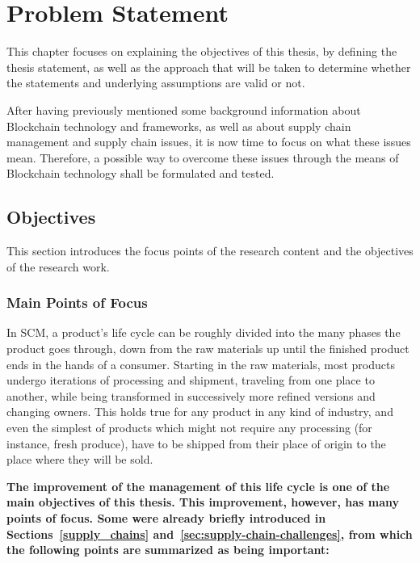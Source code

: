 \chapter{Problem Statement}
\label{chap:supply-chain-problems}
\minitoc \mtcskip \noindent 

This chapter focuses on explaining the objectives of this thesis, by defining the thesis statement, as well as the approach that will be taken to determine whether the statements and underlying assumptions are valid or not.

After having previously mentioned some background information about Blockchain technology and frameworks, as well as about supply chain management and supply chain issues, it is now time to focus on what these issues mean. Therefore, a possible way to overcome these issues through the means of Blockchain technology shall be formulated and tested.

\section{Objectives}

This section introduces the focus points of the research content and the objectives of the research work.

\subsection{Main Points of Focus}
\label{sec:points-of-focus}
In SCM, a product's life cycle can be roughly divided into the many phases the product goes through, down from the raw materials up until the finished product ends in the hands of a consumer. Starting in the raw materials, most products undergo iterations of processing and shipment, traveling from one place to another, while being transformed in successively more refined versions and changing owners. This holds true for any product in any kind of industry, and even the simplest of products which might not require any processing (for instance, fresh produce), have to be shipped from their place of origin to the place where they will be sold.


\textbf{The improvement of the management of this life cycle is one of the main objectives of this thesis. This improvement, however, has many points of focus. Some were already briefly introduced in Sections~\ref{supply_chains} and~\ref{sec:supply-chain-challenges}, from which the following points are summarized as being important:}

